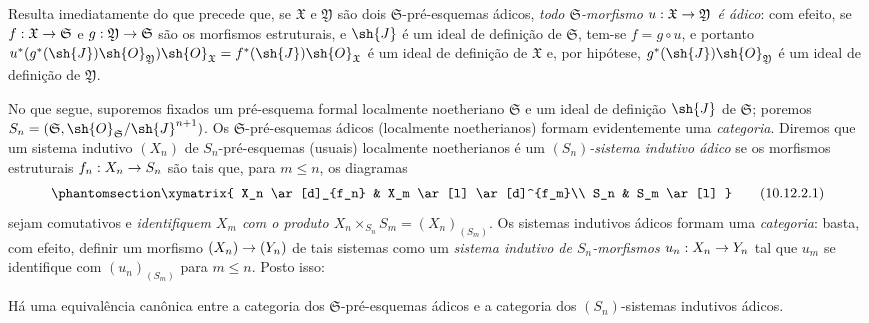 \documentclass[oneside]{amsart}
\makeatletter
\renewcommand{\leq}{\leqslant}
\newcommand{\ega@arrow}[2]{\mathchoice{#1}{#2}{#2}{#2}}
\renewcommand{\to}{\ega@arrow{\longrightarrow}{\rightarrow}}
\let\EGAOriginalLabel\label
\renewcommand{\label}[1]{\phantomsection\EGAOriginalLabel{#1}}
\makeatother
\begin{document}
Resulta imediatamente do que precede que, se $\mathfrak{X}$ e $\mathfrak{Y}$ são dois $\mathfrak{S}$-pré-esquemas ádicos, \emph{todo $\mathfrak{S}$-morfismo $u:\mathfrak{X}\to\mathfrak{Y}$ é ádico}:
com efeito, se $f:\mathfrak{X}\to\mathfrak{S}$ e $g:\mathfrak{Y}\to\mathfrak{S}$ são os morfismos estruturais, e $\sh{J}$ é um ideal de definição de $\mathfrak{S}$, tem-se $f=g\circ u$, e portanto $u^*(g^*(\sh{J})\sh{O}_\mathfrak{Y})\sh{O}_\mathfrak{X}=f^*(\sh{J})\sh{O}_\mathfrak{X}$ é um ideal de definição de $\mathfrak{X}$ e, por hipótese, $g^*(\sh{J})\sh{O}_\mathfrak{Y}$ é um ideal de definição de $\mathfrak{Y}$.

\begin{env}[10.12.2]
\label{I.10.12.2}
No que segue, suporemos fixados um pré-esquema formal localmente noetheriano $\mathfrak{S}$ e um ideal de definição $\sh{J}$ de $\mathfrak{S}$;
poremos $S_n=(\mathfrak{S},\sh{O}_\mathfrak{S}/\sh{J}^{n+1})$.
Os $\mathfrak{S}$-pré-esquemas ádicos (localmente noetherianos) formam evidentemente uma \emph{categoria}.
Diremos que um sistema indutivo $(X_n)$ de $S_n$-pré-esquemas (usuais) localmente noetherianos é um \emph{$(S_n)$-sistema indutivo ádico} se os morfismos estruturais $f_n:X_n\to S_n$ são tais que, para $m\leq n$, os diagramas
\[
\label{I.10.12.2.1}
  \xymatrix{
    X_n \ar[d]_{f_n}
    & X_m \ar[l] \ar[d]^{f_m}\\
    S_n
    & S_m \ar[l]
  }
  \tag{10.12.2.1}
\]
sejam comutativos e \emph{identifiquem $X_m$ com o produto $X_n\times_{S_n}S_m=(X_n)_{(S_m)}$}.
Os sistemas indutivos ádicos formam uma \emph{categoria}:
basta, com efeito, definir um morfismo $(X_n)\to(Y_n)$ de tais sistemas como um \emph{sistema indutivo de $S_n$-morfismos $u_n:X_n\to Y_n$} tal que $u_m$ se identifique com $(u_n)_{(S_m)}$ para $m\leq n$.
Posto isso:
\end{env}

\begin{theorem}[10.12.3]
\label{I.10.12.3}
Há uma equivalência canônica entre a categoria dos $\mathfrak{S}$-pré-esquemas ádicos e a categoria dos $(S_n)$-sistemas indutivos ádicos.
\end{theorem}
\end{document}
